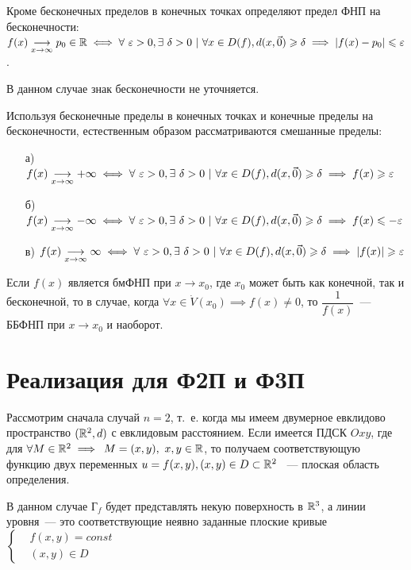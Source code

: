 \documentclass[../../main.tex]{subfiles}
\begin{document}
Кроме бесконечных пределов в конечных точках определяют предел ФНП
на бесконечности: $f(x)\underset{x \to \infty}{\longrightarrow}
p_0 \in \mathbb{R} \iff
\forall\ \varepsilon > 0, \exists\ \delta > 0\ |\
\forall x \in D(f), d(x, \vec{0}) \geqslant \delta
\implies |f(x) - p_0| \leqslant \varepsilon$.

В данном случае знак бесконечности не уточняется.

Используя бесконечные пределы в конечных точках и 
конечные пределы на бесконечности,
естественным образом рассматриваются смешанные пределы:

\begin{itemize}
	\item[а)] $f(x)\underset{x \to \infty}{\longrightarrow} +\infty \iff
	\forall\ \varepsilon > 0, \exists\ \delta > 0\ |\
	\forall x \in D(f), d(x, \vec{0}) \geqslant \delta
	\implies f(x) \geqslant \varepsilon$
	\item[б)] $f(x)\underset{x \to \infty}{\longrightarrow} -\infty \iff
	\forall\ \varepsilon > 0, \exists\ \delta > 0\ |\
	\forall x \in D(f), d(x, \vec{0}) \geqslant \delta
	\implies f(x) \leqslant -\varepsilon$
	\item[в)] $f(x)\underset{x \to \infty}{\longrightarrow} \infty \iff
	\forall\ \varepsilon > 0, \exists\ \delta > 0\ |\
	\forall x \in D(f), d(x, \vec{0}) \geqslant \delta
	\implies |f(x)| \geqslant \varepsilon$
\end{itemize}
	
Если $f(x)$ является бмФНП при $x \to x_0$, где $x_0$ может быть как конечной,
так и бесконечной, то в случае, когда $\forall x \in \dot{V}{(x_0)} \implies
f(x) \ne 0$, то $\dfrac{1}{f(x)}$~--- ББФНП при $x \to x_0$ и наоборот.
	
\section{Реализация для Ф2П и Ф3П}	

Рассмотрим сначала случай $n=2$, т.~е. когда мы имеем двумерное евклидово
пространство $(\mathbb{R}^2, d)$ с евклидовым расстоянием. Если 
имеется ПДСК $Oxy$, где для
$\forall M \in \mathbb{R}^2 \implies$
$M = (x, y),\ x, y \in \mathbb{R}$, то получаем
соответствующую функцию двух переменных 
$u = f(x, y), (x, y) \in D \subset \mathbb{R}^2$ ~---
плоская область определения.

В данном случае $\text{Г}_f$ будет представлять некую поверхность в $\mathbb{R}^3$,
а линии уровня~--- это соответствующие неявно заданные плоские кривые
$\left\{\begin{aligned}
	&f(x, y) = const \\
	&(x, y) \in D
\end{aligned}\right.$
\end{document}
